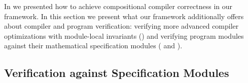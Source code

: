 In  we presented how to achieve compositional compiler correctness
in our framework.  In this section we present what our framework additionally offers about compiler and
program verification: verifying more advanced compiler optimizations with module-local
invariants () and verifying program modules against their
mathematical specification modules ( and ).



\subsection{Verification against Specification Modules}
\label{sec:overview-modulelocal:program}

\begin{figure}[t]
\end{figure}

